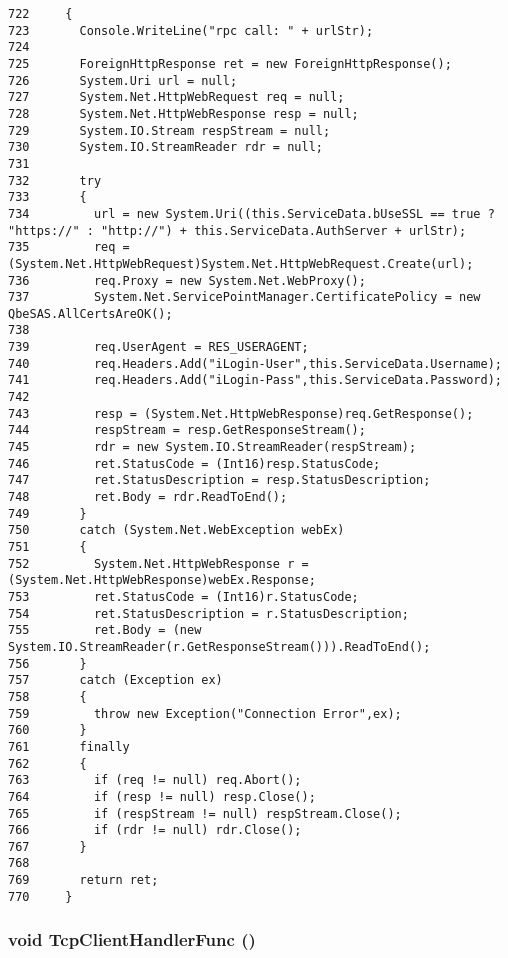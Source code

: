 \footnotesize\begin{verbatim}722     {
723       Console.WriteLine("rpc call: " + urlStr);
724       
725       ForeignHttpResponse ret = new ForeignHttpResponse();
726       System.Uri url = null;
727       System.Net.HttpWebRequest req = null;
728       System.Net.HttpWebResponse resp = null;
729       System.IO.Stream respStream = null;
730       System.IO.StreamReader rdr = null;
731 
732       try 
733       {
734         url = new System.Uri((this.ServiceData.bUseSSL == true ? "https://" : "http://") + this.ServiceData.AuthServer + urlStr);
735         req = (System.Net.HttpWebRequest)System.Net.HttpWebRequest.Create(url);
736         req.Proxy = new System.Net.WebProxy();
737         System.Net.ServicePointManager.CertificatePolicy = new QbeSAS.AllCertsAreOK();
738         
739         req.UserAgent = RES_USERAGENT;
740         req.Headers.Add("iLogin-User",this.ServiceData.Username);
741         req.Headers.Add("iLogin-Pass",this.ServiceData.Password);
742 
743         resp = (System.Net.HttpWebResponse)req.GetResponse();
744         respStream = resp.GetResponseStream();
745         rdr = new System.IO.StreamReader(respStream);
746         ret.StatusCode = (Int16)resp.StatusCode;
747         ret.StatusDescription = resp.StatusDescription;
748         ret.Body = rdr.ReadToEnd();
749       } 
750       catch (System.Net.WebException webEx)
751       {
752         System.Net.HttpWebResponse r = (System.Net.HttpWebResponse)webEx.Response;
753         ret.StatusCode = (Int16)r.StatusCode;
754         ret.StatusDescription = r.StatusDescription;
755         ret.Body = (new System.IO.StreamReader(r.GetResponseStream())).ReadToEnd();
756       }
757       catch (Exception ex)
758       {
759         throw new Exception("Connection Error",ex);
760       } 
761       finally 
762       {
763         if (req != null) req.Abort();
764         if (resp != null) resp.Close();
765         if (respStream != null) respStream.Close();
766         if (rdr != null) rdr.Close();
767       }
768       
769       return ret;
770     }
\end{verbatim}\normalsize 
\hypertarget{classQbeSAS_1_1HttpService_QbeSAS_1_1HttpServiced2}{
\subsubsection[TcpClientHandlerFunc]{\setlength{\rightskip}{0pt plus 5cm}void Tcp\-Client\-Handler\-Func ()}}
\label{classQbeSAS_1_1HttpService_QbeSAS_1_1HttpServiced2}




